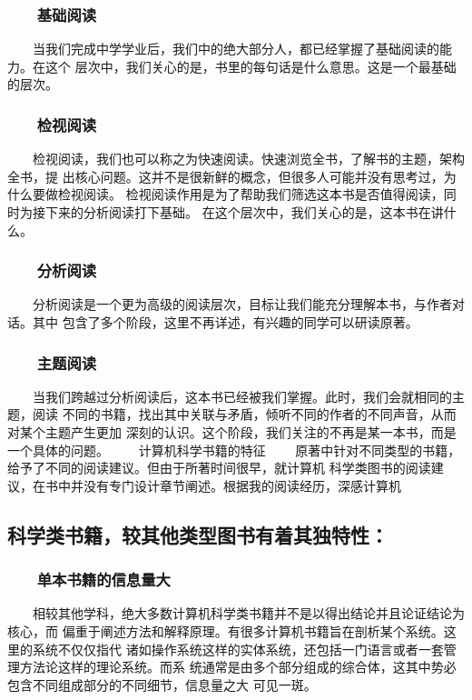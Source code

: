 \documentclass[11pt]{ctexart}
\begin{document}
{{{{\subsubsection{　　基础阅读}
\label{sec:org8dd7e0c}
　　当我们完成中学学业后，我们中的绝大部分人，都已经掌握了基础阅读的能力。在这个
层次中，我们关心的是，书里的每句话是什么意思。这是一个最基础的层次。
\subsubsection{　　检视阅读}
\label{sec:org14e327a}
　　检视阅读，我们也可以称之为快速阅读。快速浏览全书，了解书的主题，架构全书，提
出核心问题。这并不是很新鲜的概念，但很多人可能并没有思考过，为什么要做检视阅读。
检视阅读作用是为了帮助我们筛选这本书是否值得阅读，同时为接下来的分析阅读打下基础。
在这个层次中，我们关心的是，这本书在讲什么。
\subsubsection{　　分析阅读}
\label{sec:org0387879}
　　分析阅读是一个更为高级的阅读层次，目标让我们能充分理解本书，与作者对话。其中
包含了多个阶段，这里不再详述，有兴趣的同学可以研读原著。
\subsubsection{　　主题阅读}
\label{sec:org44270c4}
　　当我们跨越过分析阅读后，这本书已经被我们掌握。此时，我们会就相同的主题，阅读
不同的书籍，找出其中关联与矛盾，倾听不同的作者的不同声音，从而对某个主题产生更加
深刻的认识。这个阶段，我们关注的不再是某一本书，而是一个具体的问题。
　　计算机科学书籍的特征
　　原著中针对不同类型的书籍，给予了不同的阅读建议。但由于所著时间很早，就计算机
科学类图书的阅读建议，在书中并没有专门设计章节阐述。根据我的阅读经历，深感计算机
\subsection{科学类书籍，较其他类型图书有着其独特性：}
\label{sec:org5c6d023}
\subsubsection{　　单本书籍的信息量大}
\label{sec:orgce0ebcc}
　　相较其他学科，绝大多数计算机科学类书籍并不是以得出结论并且论证结论为核心，而
偏重于阐述方法和解释原理。有很多计算机书籍旨在剖析某个系统。这里的系统不仅仅指代
诸如操作系统这样的实体系统，还包括一门语言或者一套管理方法论这样的理论系统。而系
统通常是由多个部分组成的综合体，这其中势必包含不同组成部分的不同细节，信息量之大
可见一斑。
}}}}
\end{document}
